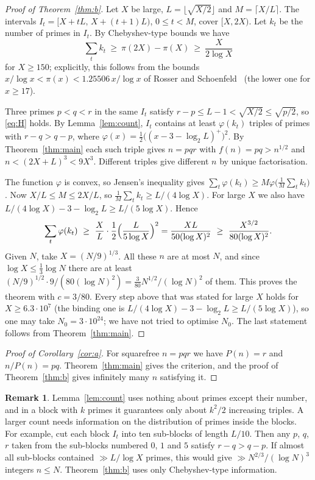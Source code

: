\documentclass[11pt,a4paper]{article}
\theoremstyle{definition}
\newtheorem{remark}[theorem]{Remark}
\begin{document}
\begin{proof}[Proof of Theorem~\ref{thm:b}]
Let $X$ be large, $L=\lfloor\sqrt{X/2}\rfloor$ and $M=\lceil X/L\rceil$. The intervals $I_t=[X+tL,\,X+(t+1)L)$, $0\le t<M$, cover $[X,2X)$. Let $k_t$ be the number of primes in $I_t$. By Chebyshev-type bounds we have
\[
\sum_t k_t\ \ge\ \pi(2X)-\pi(X)\ \ge\ \frac{X}{2\log X}
\]
for $X\ge150$; explicitly, this follows from the bounds $x/\log x<\pi(x)<1.25506\,x/\log x$ of Rosser and Schoenfeld~\cite{RS62} (the lower one for $x\ge17$).

Three primes $p<q<r$ in the same $I_t$ satisfy $r-p\le L-1<\sqrt{X/2}\le\sqrt{p/2}$, so \eqref{eq:H} holds. By Lemma~\ref{lem:count}, $I_t$ contains at least $\varphi(k_t)$ triples of primes with $r-q>q-p$, where $\varphi(x)=\tfrac12\bigl((x-3-\log_2L)^+\bigr)^2$. By Theorem~\ref{thm:main} each such triple gives $n=pqr$ with $f(n)=pq>n^{1/2}$ and $n<(2X+L)^3<9X^3$. Different triples give different $n$ by unique factorisation.

The function $\varphi$ is convex, so Jensen's inequality gives $\sum_t\varphi(k_t)\ge M\varphi\bigl(\frac1M\sum_tk_t\bigr)$. Now $X/L\le M\le 2X/L$, so $\frac1M\sum_tk_t\ge L/(4\log X)$. For large $X$ we also have $L/(4\log X)-3-\log_2L\ge L/(5\log X)$. Hence
\[
\sum_t\varphi(k_t)\ \ge\ \frac XL\cdot\frac12\Bigl(\frac{L}{5\log X}\Bigr)^2=\frac{XL}{50(\log X)^2}\ \ge\ \frac{X^{3/2}}{80(\log X)^2}.
\]
Given $N$, take $X=(N/9)^{1/3}$. All these $n$ are at most $N$, and since $\log X\le\frac13\log N$ there are at least $(N/9)^{1/2}\cdot9/(80(\log N)^2)=\frac{3}{80}N^{1/2}/(\log N)^2$ of them. This proves the theorem with $c=3/80$. Every step above that was stated for large $X$ holds for $X\ge6.3\cdot10^{7}$ (the binding one is $L/(4\log X)-3-\log_2L\ge L/(5\log X)$), so one may take $N_0=3\cdot10^{24}$; we have not tried to optimise $N_0$. The last statement follows from Theorem~\ref{thm:main}.
\end{proof}

\begin{proof}[Proof of Corollary~\ref{cor:a}]
For squarefree $n=pqr$ we have $P(n)=r$ and $n/P(n)=pq$. Theorem~\ref{thm:main} gives the criterion, and the proof of Theorem~\ref{thm:b} gives infinitely many $n$ satisfying it.
\end{proof}

\begin{remark}
Lemma~\ref{lem:count} uses nothing about primes except their number, and in a block with $k$ primes it guarantees only about $k^2/2$ increasing triples. A larger count needs information on the distribution of primes inside the blocks. For example, cut each block $I_t$ into ten sub-blocks of length $L/10$. Then any $p$, $q$, $r$ taken from the sub-blocks numbered $0$, $1$ and $5$ satisfy $r-q>q-p$. If almost all sub-blocks contained $\gg L/\log X$ primes, this would give $\gg N^{2/3}/(\log N)^3$ integers $n\le N$. Theorem~\ref{thm:b} uses only Chebyshev-type information.
\end{remark}
\end{document}
